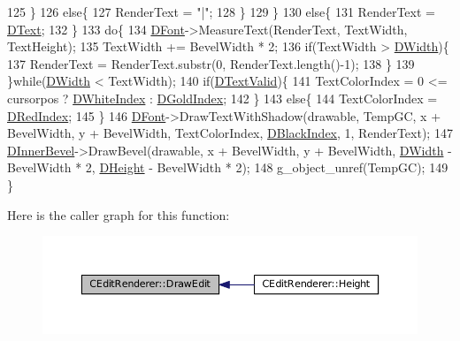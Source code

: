 \begin{DoxyCode}
125         \}
126         \textcolor{keywordflow}{else}\{
127             RenderText = \textcolor{stringliteral}{"|"};   
128         \}
129     \}
130     \textcolor{keywordflow}{else}\{
131         RenderText = \hyperlink{classCEditRenderer_af79bf047383c610d4fc24d937e29c594}{DText};
132     \}
133     \textcolor{keywordflow}{do}\{
134         \hyperlink{classCEditRenderer_afd108ae6cb3e9eeffce881a1ada0f0db}{DFont}->MeasureText(RenderText, TextWidth, TextHeight); 
135         TextWidth += BevelWidth * 2;
136         \textcolor{keywordflow}{if}(TextWidth > \hyperlink{classCEditRenderer_ab203e5083f61d3575eb491f170c21d45}{DWidth})\{
137             RenderText = RenderText.substr(0, RenderText.length()-1);
138         \}
139     \}\textcolor{keywordflow}{while}(\hyperlink{classCEditRenderer_ab203e5083f61d3575eb491f170c21d45}{DWidth} < TextWidth);
140     \textcolor{keywordflow}{if}(\hyperlink{classCEditRenderer_ab4f0c6b356170adad1ad3b3e16573966}{DTextValid})\{
141         TextColorIndex = 0 <= cursorpos ? \hyperlink{classCEditRenderer_aaa97fde55438f6ad02cbb365097a2274}{DWhiteIndex} : \hyperlink{classCEditRenderer_adef6e0cd1cc67b18a196bbac95a7306b}{DGoldIndex};
142     \}
143     \textcolor{keywordflow}{else}\{
144         TextColorIndex = \hyperlink{classCEditRenderer_a77ce4df48e03a8b9245f2045c2c3c4e7}{DRedIndex};   
145     \}
146     \hyperlink{classCEditRenderer_afd108ae6cb3e9eeffce881a1ada0f0db}{DFont}->DrawTextWithShadow(drawable, TempGC, x + BevelWidth, y + BevelWidth, TextColorIndex, 
      \hyperlink{classCEditRenderer_a13b03f02ff6673d8df2d6509c17bcccc}{DBlackIndex}, 1, RenderText);
147     \hyperlink{classCEditRenderer_a45b1bf4e9aebe3811c15df1018b8d8da}{DInnerBevel}->DrawBevel(drawable, x + BevelWidth, y + BevelWidth, 
      \hyperlink{classCEditRenderer_ab203e5083f61d3575eb491f170c21d45}{DWidth} - BevelWidth * 2, \hyperlink{classCEditRenderer_ade8dedb4f9790d28b38da8ef20a171cb}{DHeight} - BevelWidth * 2);
148     g\_object\_unref(TempGC);
149 \}
\end{DoxyCode}
Here is the caller graph for this function\+:\nopagebreak
\begin{figure}[H]
\begin{center}
\leavevmode
\includegraphics[width=350pt]{classCEditRenderer_a3b043cca5f931cdbbfff35d07100be5e_icgraph}
\end{center}
\end{figure}
\hypertarget{classCEditRenderer_ad5ad32a8ae2372e21bb9365a6b6d0f59}{}\label{classCEditRenderer_ad5ad32a8ae2372e21bb9365a6b6d0f59} 
